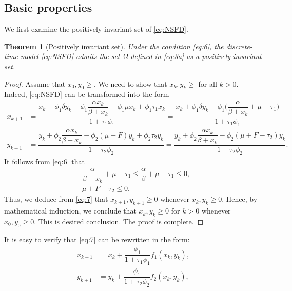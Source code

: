 \documentclass[12pt]{article}
\newtheorem{theorem}{Theorem}[section]
\theoremstyle{definition}
\theoremstyle{remark}
\numberwithin{equation}{section}
\begin{document}
\subsection{Basic properties}
We first examine the positively invariant set of \eqref{eq:NSFD}.
\begin{theorem}[Positively invariant set]\label{Theorem1}
Under the condition \eqref{eq:6}, the discrete-time model \eqref{eq:NSFD} admits the set $\Omega$ defined in \eqref{eq:3a} as a positively invariant set.
\end{theorem}
\begin{proof}
Assume that $x_0, y_0 \geq$. We need to show that $x_k, y_k \geq$ for all $k > 0$. Indeed, \eqref{eq:NSFD} can be transformed into the form
\begin{equation}\label{eq:7}
\begin{split}
x_{k + 1} &= \dfrac{x_k + \phi_1\delta y_k - \phi_1\dfrac{\alpha x_{k}}{\beta + x_k}- \phi_1\mu x_{k} + \phi_1\tau_1x_k}{1 + \tau_1\phi_1} = \dfrac{x_k + \phi_1\delta y_k - \phi_1\bigg(\dfrac{\alpha}{\beta + x_k} +  \mu - \tau_1\bigg)}{1 + \tau_1\phi_1}\\
y_{k + 1} &= \dfrac{y_k + \phi_2\dfrac{\alpha x_{k}}{\beta + x_k} - \phi_2(\mu+F) y_{k} + \phi_2\tau_2y_k}{1 + \tau_2\phi_2} = \dfrac{y_k + \phi_2\dfrac{\alpha x_{k}}{\beta + x_k} - \phi_2(\mu+F - \tau_2)y_k}{1 + \tau_2\phi_2}.
\end{split}
\end{equation}
It follows from \eqref{eq:6} that
\begin{equation*}
\begin{split}
&\dfrac{\alpha}{\beta + x_k} +  \mu - \tau_1 \leq \dfrac{\alpha}{\beta} + \mu - \tau_1 \leq 0,\\
&\mu+F - \tau_2 \leq 0.
\end{split}
\end{equation*}
Thus, we deduce from \eqref{eq:7} that $x_{k + 1}, y_{k + 1} \geq 0$ whenever $x_k, y_k \geq 0$. Hence, by mathematical induction, we conclude that $x_k, y_k \geq 0$ for $k > 0$ whenever $x_0, y_0 \geq 0$. This is desired conclusion. The proof is complete.
\end{proof}
It is easy to verify that \eqref{eq:7} can be rewritten in the form:
\begin{equation}\label{eq:NSFD1}
\begin{split}
x_{k+1} &= x_k + \dfrac{\phi_1}{1 + \tau_1\phi_1}f_1(x_k, y_k),\\
y_{k+1} &= y_k + \dfrac{\phi_1}{1 + \tau_2\phi_2}f_2(x_k, y_k),
\end{split}
\end{equation}
\end{document}
